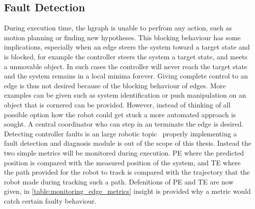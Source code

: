\subsection{Fault Detection}%
\label{subsec:fault_detection}
During execution time, the \ac{hgraph} is unable to perfrom any action, such as motion planning or finding new hypotheses. This blocking behaviour has some implications, especially when an edge steers the system toward a target state and is blocked, for example the controller steers the system a target state, and meets a unmovable object. In such cases the controller will never reach the target state and the system remains in a local minima forever. Giving complete control to an edge is thus not desired because of the blocking behaviour of edges. More examples can be given such as system identification or push manipulation on an object that is cornered can be provided. However, instead of thinking of all possible option how the robot could get stuck a more automated approach is sought.  A central coordinator who can step in an terminate the edge is desired. Detecting controller faults is an large robotic topic~\cite{khalastchi_fault_2019} properly implementing a fault detection and diagnosis module is out of the scope of this thesis. Instead the two simple metrics will be monitored during execution. \ac{PE} where the predicted position is compared with the measured position of the system, and \ac{TE} where the path provided for the robot to track is compared with the trajectory that the robot made during tracking such a path. Defenitions of \ac{PE} and \ac{TE} are now given, in \cref{table:monitoring_edge_metrics} insight is provided why a metric would catch certain faulty behaviour.


